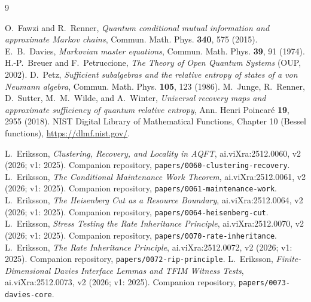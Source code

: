 \documentclass[11pt,a4paper]{article}
\theoremstyle{plain}
\theoremstyle{definition}
\theoremstyle{remark}
\begin{document}
\begin{thebibliography}{9}\small

 O.~Fawzi and R.~Renner, \emph{Quantum conditional
mutual information and approximate Markov chains}, Commun. Math. Phys.
\textbf{340}, 575 (2015).
 E.~B.~Davies, \emph{Markovian master equations}, Commun.
Math. Phys. \textbf{39}, 91 (1974).
 H.-P.~Breuer and F.~Petruccione, \emph{The Theory
of Open Quantum Systems} (OUP, 2002).
 D.~Petz, \emph{Sufficient subalgebras and the relative
entropy of states of a von Neumann algebra}, Commun. Math. Phys. \textbf{105},
123 (1986).
 M.~Junge, R.~Renner, D.~Sutter, M.~M.~Wilde, and A.~Winter,
\emph{Universal recovery maps and approximate sufficiency of quantum relative
entropy}, Ann. Henri Poincar\'e \textbf{19}, 2955 (2018).
 NIST Digital Library of Mathematical Functions, Chapter 10
(Bessel functions), \url{https://dlmf.nist.gov/}.

 L.~Eriksson, \emph{Clustering, Recovery, and Locality in
AQFT}, ai.viXra:2512.0060, v2 (2026; v1: 2025). Companion repository,
\texttt{papers/0060-clustering-recovery}.
 L.~Eriksson, \emph{The Conditional Maintenance Work Theorem},
ai.viXra:2512.0061, v2 (2026; v1: 2025). Companion repository,
\texttt{papers/0061-maintenance-work}.
 L.~Eriksson, \emph{The Heisenberg Cut as a Resource Boundary},
ai.viXra:2512.0064, v2 (2026; v1: 2025). Companion repository,
\texttt{papers/0064-heisenberg-cut}.
 L.~Eriksson, \emph{Stress Testing the Rate Inheritance
Principle}, ai.viXra:2512.0070, v2 (2026; v1: 2025). Companion repository,
\texttt{papers/0070-rate-inheritance}.
 L.~Eriksson, \emph{The Rate Inheritance Principle},
ai.viXra:2512.0072, v2 (2026; v1: 2025). Companion repository,
\texttt{papers/0072-rip-principle}.
 L.~Eriksson, \emph{Finite-Dimensional Davies Interface
Lemmas and TFIM Witness Tests}, ai.viXra:2512.0073, v2 (2026; v1: 2025).
Companion repository, \texttt{papers/0073-davies-core}.

\end{thebibliography}
\end{document}

